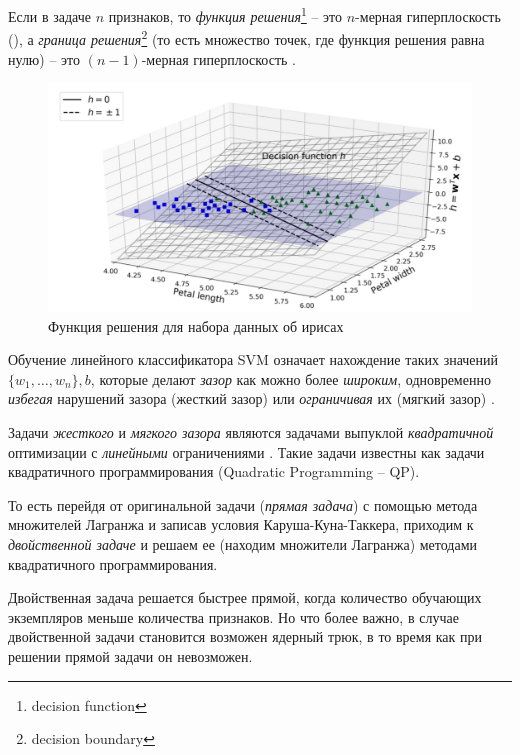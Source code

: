 \documentclass[%
	11pt,
	a4paper,
	utf8,
		]{article}
\begin{document}

Если в задаче $ n $ признаков, то \emph{функция решения}\footnote{decision function} -- это $ n $-мерная гиперплоскость (), а \emph{граница решения}\footnote{decision boundary} (то есть множество точек, где функция решения равна нулю) -- это $ (n - 1) $-мерная гиперплоскость \cite[]{geron:hands_on_ml}.

\begin{figure}[h]
	\centering
	\includegraphics[scale=0.7]{figures/svm_des_fun.png}
	\caption{ Функция решения для набора данных об ирисах }\label{fig:svm_des_fun}
\end{figure}

Обучение линейного классификатора SVM означает нахождение таких значений $ \{w_1, \ldots, w_n\}, b $, которые делают \emph{зазор} как можно более \emph{широким}, одновременно \emph{избегая} нарушений зазора (жесткий зазор) или \emph{ограничивая} их (мягкий зазор) \cite[]{geron:hands_on_ml}.

Задачи \emph{жесткого} и \emph{мягкого зазора} являются задачами выпуклой \emph{квадратичной} оптимизации с \emph{линейными} ограничениями \cite[]{geron:hands_on_ml}. Такие задачи известны как задачи квадратичного программирования (Quadratic Programming -- QP).

То есть перейдя от оригинальной задачи (\emph{прямая задача}) с помощью метода множителей Лагранжа и записав условия Каруша-Куна-Таккера, приходим к \emph{двойственной задаче} и решаем ее (находим множители Лагранжа) методами квадратичного программирования.

Двойственная задача решается быстрее прямой, когда количество обучающих экземпляров меньше количества признаков. Но что более важно, в случае двойственной задачи становится возможен ядерный трюк, в то время как при решении прямой задачи он невозможен.
\end{document}
